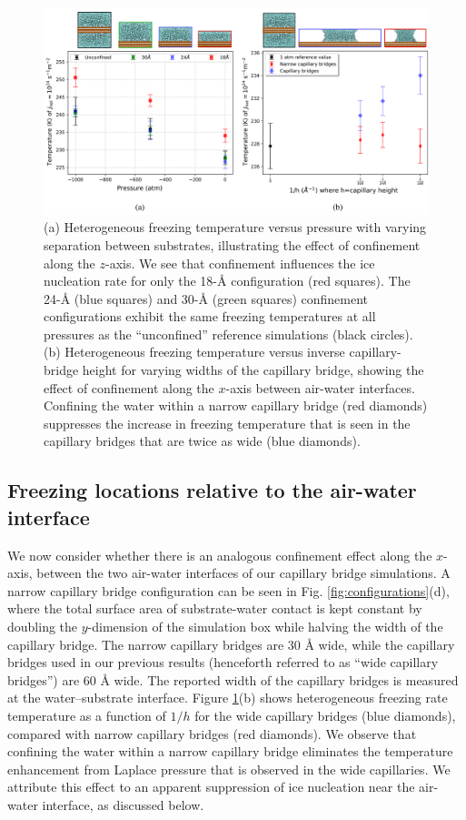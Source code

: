 \documentclass[journal abbreviation, manuscript]{copernicus}
\begin{document}
\begin{figure}[t]
\includegraphics[width=12cm]{figures/confinement_effects.png}
\caption{(a) Heterogeneous freezing temperature versus pressure with varying separation between substrates, illustrating the effect of confinement along the $z$-axis. We see that confinement influences the ice nucleation rate for only the 18-\AA{} configuration (red squares). The 24-\AA{} (blue squares) and 30-\AA{} (green squares) confinement configurations exhibit the same freezing temperatures at all pressures as the ``unconfined'' reference simulations (black circles). (b) Heterogeneous freezing temperature versus inverse capillary-bridge height for varying widths of the capillary bridge, showing the effect of confinement along the $x$-axis between air-water interfaces. Confining the water within a narrow capillary bridge (red diamonds) suppresses the increase in freezing temperature that is seen in the capillary bridges that are twice as wide (blue diamonds).}
\label{fig:confinement}
\end{figure}



\subsection{Freezing locations relative to the air-water interface} \label{ice locations}

We now consider whether there is an analogous confinement effect along the $x$-axis, between the two air-water interfaces of our capillary bridge simulations. A narrow capillary bridge configuration can be seen in Fig. \ref{fig:configurations}(d), where the total surface area of substrate-water contact is kept constant by doubling the $y$-dimension of the simulation box while halving the width of the capillary bridge. The narrow capillary bridges are 30 \AA{} wide, while the capillary bridges used in our previous results (henceforth referred to as ``wide capillary bridges'') are 60 \AA{} wide. The reported width of the capillary bridges is measured at the water--substrate interface. Figure \ref{fig:confinement}(b) shows heterogeneous freezing rate temperature as a function of $1/h$ for the wide capillary bridges (blue diamonds), compared with narrow capillary bridges (red diamonds). We observe that confining the water within a narrow capillary bridge eliminates the temperature enhancement from Laplace pressure that is observed in the wide capillaries. We attribute this effect to an apparent suppression of ice nucleation near the air-water interface, as discussed below. 
\end{document}
